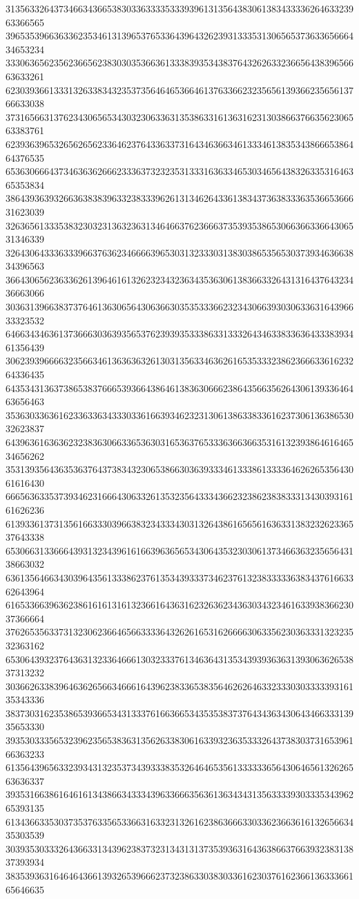 31356332643734663436653830336333353339396131356438306138343333626463323963366565
39653539663633623534613139653765336439643262393133353130656537363365666434653234
33306365623562366562383030353663613338393534383764326263323665643839656663633261
62303936613331326338343235373564646536646137633662323565613936623565613766633038
37316566313762343065653430323063363135386331613631623130386637663562306563383761
62393639653265626562336462376433633731643463663461333461383534386665386464376535
65363066643734636362666233363732323531333163633465303465643832633531646365353834
38643936393266363838396332383339626131346264336138343736383336353665366631623039
32636561333538323032313632363134646637623666373539353865306636633664306531346339
32643064333633396637636234666639653031323330313830386535653037393463663834396563
36643065623633626139646161326232343236343536306138366332643131643764323436663066
30363139663837376461363065643063663035353336623234306639303063363164396633323532
64663434636137366630363935653762393935333863313332643463383363643338393461356439
30623939666632356634613636363261303135633463626165353332386236663361623264336435
64353431363738653837666539366438646138363066623864356635626430613933646463656463
35363033636162336336343330336166393462323130613863383361623730613638653032623837
64396361636362323836306633653630316536376533363663663531613239386461646534656262
35313935643635363764373834323065386630363933346133386133336462626535643061616430
66656363353739346231666430633261353235643334366232386238383331343039316161626236
61393361373135616633303966383234333430313264386165656163633138323262336537643338
65306631336664393132343961616639636565343064353230306137346636323565643138663032
63613564663430396435613338623761353439333734623761323833333638343761663362643964
61653366396362386161613161323661643631623263623436303432346163393836623037366664
37626535633731323062366465663333643262616531626666306335623036333132323532363162
65306439323764363132336466613032333761346364313534393936363139306362653837313232
30366263383964636265663466616439623833653835646262646332333030333339316135343336
38373031623538653936653431333761663665343535383737643436343064346633313935653330
39353033356532396235653836313562633830616339323635333264373830373165396166363233
61356439656332393431323537343933383532646465356133333365643064656132626563636337
39353166386164616134386634333439633666356361363434313563333930333534396265393135
61343663353037353763356533663163323132616238636663303362366361613265663435303539
30393530333264366331343962383732313431313735393631643638663766393238313837393934
38353936316464643661393265396662373238633038303361623037616236613633366165646635
